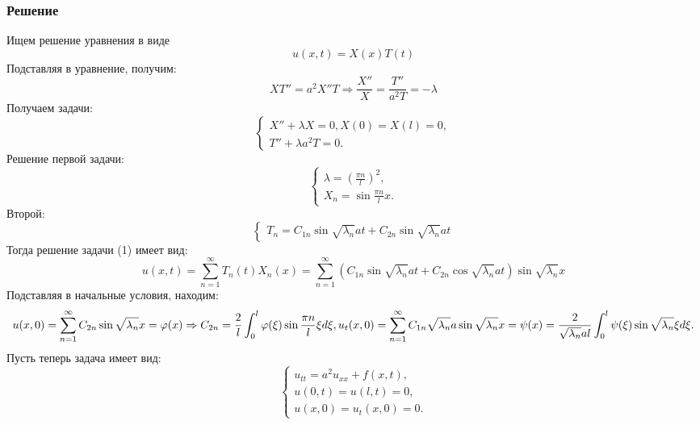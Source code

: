 \documentclass[11pt]{article}
\begin{document}
\subsubsection{Решение}
\label{sec:orgd58cdf0}
Ищем решение уравнения в виде
\begin{equation}
u(x, t) = X(x)T(t)
\end{equation}
Подставляя в уравнение, получим:
\begin{equation}
XT'' = a^2X''T \Rightarrow \frac{X''}X = \frac{T''}{a^2T} = -\lambda
\end{equation}
Получаем задачи:
\begin{equation}
\begin{cases}
X'' + \lambda X = 0, X(0) = X(l) = 0, \\
T'' + \lambda a^2T = 0.
\end{cases}
\end{equation}
Решение первой задачи:
\begin{equation}
\begin{cases}
\lambda = \left(\frac{\pi n}l\right)^2, \\
X_n = \sin\frac{\pi n}lx.
\end{cases}
\end{equation}
Второй:
\begin{equation}
\begin{cases}
T_n = C_{1n}\sin\sqrt{\lambda_n}at + C_{2n}\sin\sqrt{\lambda_n}at
\end{cases}
\end{equation}
Тогда решение задачи (1) имеет вид:
\begin{equation}
u(x, t) = \sum_{n = 1}^{\infty}T_n(t)X_n(x) = \sum_{n = 1}^{\infty}(C_{1n}\sin\sqrt{\lambda_n}at +
C_{2n}\cos\sqrt{\lambda_n}at)\sin\sqrt{\lambda_n}x
\end{equation}
Подставляя в начальные условия, находим:
\begin{equation}
u(x, 0) = \sum_{n = 1}^{\infty}C_{2n}\sin\sqrt{\lambda_n}x = \varphi(x) \Rightarrow C_{2n} =
\frac2l\int_0^l\varphi(\xi)\sin\frac{\pi n}l\xi d\xi, \\
u_t(x, 0) = \sum_{n = 1}^{\infty}C_{1n}\sqrt{\lambda_n}a\sin\sqrt{\lambda_n}x = \psi(x) =
\frac2{\sqrt{\lambda_n}al}\int_0^l\psi(\xi)\sin\sqrt{\lambda_n}\xi d\xi.
\end{equation}
Пусть теперь задача имеет вид:
\begin{equation}
\begin{cases}
u_{tt} = a^2u_{xx} + f(x, t), \\
u(0, t) = u(l, t) = 0, \\
u(x, 0) = u_t(x, 0) = 0.
\end{cases}
\end{equation}
\end{document}
